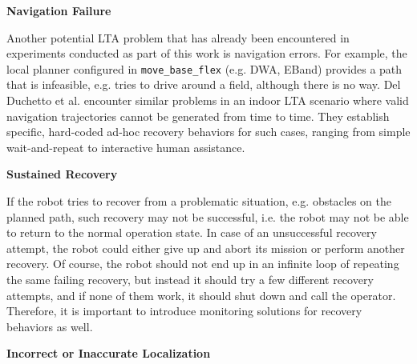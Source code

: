 \documentclass[english, master, utf8]{base/thesis_KBS}
\newcommand{\code}[1]{\colorbox{light-gray}{\texttt{#1}}}
\begin{document}
\noindent
\textbf{Navigation Failure}\newline

\noindent
Another potential LTA problem that has already been encountered in experiments conducted as part of this work is navigation errors.
For example, the local planner configured in \code{move\_base\_flex} (e.g. DWA, EBand) provides a path that is infeasible, e.g. tries to drive around a field, 
although there is no way. Del Duchetto et al. encounter similar problems in an indoor LTA scenario where valid navigation trajectories cannot be generated from time to time.
They establish specific, hard-coded ad-hoc recovery behaviors for such cases, ranging from simple wait-and-repeat to interactive human assistance. \cite{DelDuchetto:2018}

\pagebreak

\noindent
\textbf{Sustained Recovery}\newline

\noindent
If the robot tries to recover from a problematic situation, e.g. obstacles on the planned path, such recovery may not be successful, i.e. the robot may not be able
to return to the normal operation state. In case of an unsuccessful recovery attempt, the robot could either give up and abort its mission or perform another recovery.
Of course, the robot should not end up in an infinite loop of repeating the same failing recovery, but instead it should try a few different recovery attempts,
and if none of them work, it should shut down and call the operator. Therefore, it is important to introduce monitoring solutions for recovery behaviors as well.\newline

\noindent
\textbf{Incorrect or Inaccurate Localization}\newline
\end{document}
